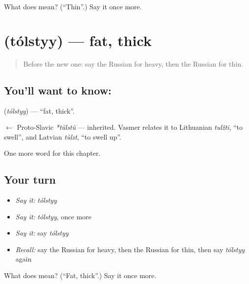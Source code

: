 \begin{tcolorbox}[breakable,colback=teal!4,colframe=teal!35!black,title={Before you move on}]
What does  mean? (\textquotedblleft{}Thin\textquotedblright{}.) Say it once more.
\end{tcolorbox}
\section[\texorpdfstring{\ru{толстый} (tólstyy)}{толстый (tólstyy)}]{ (tólstyy) — fat, thick}

\label{lesson:RU-C130-fat}



\begin{quote}
Before the new one: say the Russian for heavy, then the Russian for thin.
\end{quote}

\subsection*{You'll want to know: }
\textbf{} (\emph{tólstyy}) — \textquotedblleft{}fat, thick\textquotedblright{}.

\begin{cousinweb}
\textbf{} $\leftarrow$ Proto-Slavic \emph{*tŭlstŭ} — inherited. Vasmer relates it to Lithuanian \emph{tulžti}, \textquotedblleft{}to swell\textquotedblright{}, and Latvian \emph{tùlzt}, \textquotedblleft{}to swell up\textquotedblright{}.
\end{cousinweb}

\begin{grammarlens}[title={What you've built}]
One more word for this chapter.
\end{grammarlens}

\subsection*{Your turn}
\begin{itemize}
\raggedright
  \item \emph{Say it:} \emph{tólstyy}
  \item \emph{Say it:} \emph{tólstyy}, once more
  \item \emph{Say it:} say \emph{tólstyy}
  \item \emph{Recall:} say the Russian for heavy, then the Russian for thin, then say \emph{tólstyy} again
\end{itemize}

\begin{tcolorbox}[breakable,colback=teal!4,colframe=teal!35!black,title={Before you move on}]
What does  mean? (\textquotedblleft{}Fat, thick\textquotedblright{}.) Say it once more.
\end{tcolorbox}
